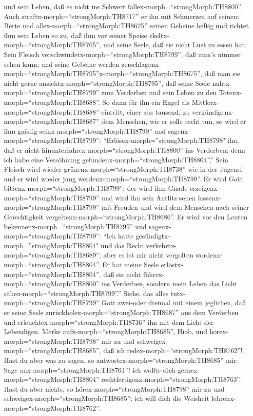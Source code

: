 und sein Leben, daß es nicht ins Schwert
fallex-morph=``strongMorph:TH8800''.  Auch
straftx-morph=``strongMorph:TH8717'' er ihn mit Schmerzen auf seinem
Bette und allex-morph=``strongMorph:TH8675'' seinen Gebeine heftig
 und richtet ihm sein Leben so zu, daß ihm vor seiner
Speise ekeltx-morph=``strongMorph:TH8765'', und seine Seele, daß sie
nicht Lust zu essen hat.  Sein Fleisch
verschwindetx-morph=``strongMorph:TH8799'', daß man's nimmer sehen kann;
und seine Gebeine werden
zerschlagenx-morph=``strongMorph:TH8795''\textbar x-morph=``strongMorph:TH8675'',
daß man sie nicht gerne ansiehtx-morph=``strongMorph:TH8795'',
 daß seine Seele nahtx-morph=``strongMorph:TH8799'' zum
Verderben und sein Leben zu den Totenx-morph=``strongMorph:TH8688''.
 So dann für ihn ein Engel als
Mittlerx-morph=``strongMorph:TH8688'' eintritt, einer aus tausend, zu
verkündigenx-morph=``strongMorph:TH8687'' dem Menschen, wie er solle
recht tun,  so wird er ihm gnädig
seinx-morph=``strongMorph:TH8799'' und
sagenx-morph=``strongMorph:TH8799'':
``Erlösex-morph=''strongMorph:TH8798" ihn, daß er nicht
hinunterfahrex-morph=``strongMorph:TH8800'' ins Verderben; denn ich habe
eine Versöhnung gefundenx-morph=``strongMorph:TH8804''.'' 
Sein Fleisch wird wieder grünenx-morph=``strongMorph:TH8738'' wie in der
Jugend, und er wird wieder jung werdenx-morph=``strongMorph:TH8799''.
 Er wird Gott bittenx-morph=``strongMorph:TH8799''; der
wird ihm Gnade erzeigenx-morph=``strongMorph:TH8799'' und wird ihn sein
Antlitz sehen lassenx-morph=``strongMorph:TH8799'' mit Freuden und wird
dem Menschen nach seiner Gerechtigkeit
vergeltenx-morph=``strongMorph:TH8686''.  Er wird vor den
Leuten bekennenx-morph=``strongMorph:TH8799'' und
sagenx-morph=``strongMorph:TH8799'': ``Ich hatte
gesündigtx-morph=''strongMorph:TH8804" und das Recht
verkehrtx-morph=``strongMorph:TH8689''; aber es ist mir nicht vergolten
wordenx-morph=``strongMorph:TH8804''.  Er hat meine Seele
erlöstx-morph=``strongMorph:TH8804'', daß sie nicht
führex-morph=``strongMorph:TH8800'' ins Verderben, sondern mein Leben
das Licht sähex-morph=``strongMorph:TH8799''.''  Siehe, das
alles tutx-morph=``strongMorph:TH8799'' Gott zwei-oder dreimal mit einem
jeglichen,  daß er seine Seele
zurückholex-morph=``strongMorph:TH8687'' aus dem Verderben und
erleuchtex-morph=``strongMorph:TH8736'' ihn mit dem Licht der
Lebendigen.  Merke aufx-morph=``strongMorph:TH8685'', Hiob,
und hörex-morph=``strongMorph:TH8798'' mir zu und
schweigex-morph=``strongMorph:TH8685'', daß ich
redex-morph=``strongMorph:TH8762''!  Hast du aber was zu
sagen, so antwortex-morph=``strongMorph:TH8685'' mir; Sage
anx-morph=``strongMorph:TH8761''! ich wollte dich
gernex-morph=``strongMorph:TH8804''
rechtfertigenx-morph=``strongMorph:TH8763''.  Hast du aber
nichts, so hörex-morph=``strongMorph:TH8798'' mir zu und
schweigex-morph=``strongMorph:TH8685''; ich will dich die Weisheit
lehrenx-morph=``strongMorph:TH8762''.

